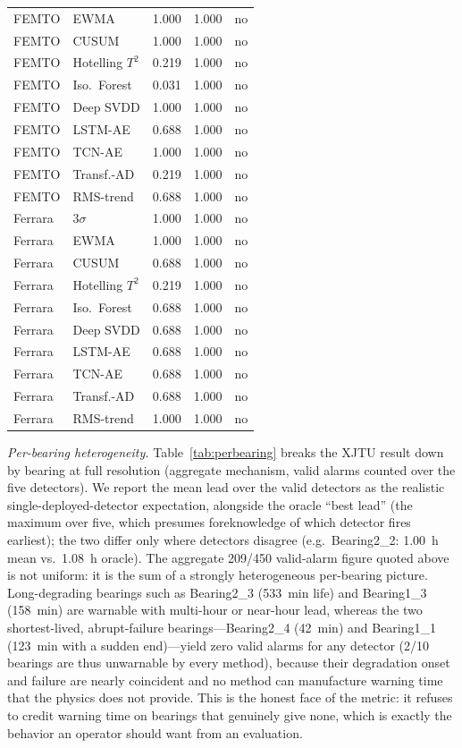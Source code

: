 \documentclass[IJPHM, 2026, 0]{PHMSociety}
\begin{document}
\begin{table}[t]
\begin{center}
\begin{tabular}{l l r r c}
		FEMTO & EWMA & 1.000 & 1.000 & no \\
		FEMTO & CUSUM & 1.000 & 1.000 & no \\
		FEMTO & Hotelling $T^2$ & 0.219 & 1.000 & no \\
		FEMTO & Iso.\ Forest & 0.031 & 1.000 & no \\
		FEMTO & Deep SVDD & 1.000 & 1.000 & no \\
		FEMTO & LSTM-AE & 0.688 & 1.000 & no \\
		FEMTO & TCN-AE & 1.000 & 1.000 & no \\
		FEMTO & Transf.-AD & 0.219 & 1.000 & no \\
		FEMTO & RMS-trend & 0.688 & 1.000 & no \\
		Ferrara & $3\sigma$ & 1.000 & 1.000 & no \\
		Ferrara & EWMA & 1.000 & 1.000 & no \\
		Ferrara & CUSUM & 0.688 & 1.000 & no \\
		Ferrara & Hotelling $T^2$ & 0.219 & 1.000 & no \\
		Ferrara & Iso.\ Forest & 0.688 & 1.000 & no \\
		Ferrara & Deep SVDD & 0.688 & 1.000 & no \\
		Ferrara & LSTM-AE & 0.688 & 1.000 & no \\
		Ferrara & TCN-AE & 0.688 & 1.000 & no \\
		Ferrara & Transf.-AD & 0.688 & 1.000 & no \\
		Ferrara & RMS-trend & 1.000 & 1.000 & no \\
		\hline \hline
	\end{tabular}
	\end{center}
\end{table}

\emph{Per-bearing heterogeneity.} Table~\ref{tab:perbearing} breaks the XJTU result down by bearing at full resolution (aggregate mechanism, valid alarms counted over the five detectors). We report the mean lead over the valid detectors as the realistic single-deployed-detector expectation, alongside the oracle ``best lead'' (the maximum over five, which presumes foreknowledge of which detector fires earliest); the two differ only where detectors disagree (e.g.\ Bearing2\_2: 1.00~h mean vs.\ 1.08~h oracle). The aggregate 209/450 valid-alarm figure quoted above is not uniform: it is the sum of a strongly heterogeneous per-bearing picture. Long-degrading bearings such as Bearing2\_3 (533~min life) and Bearing1\_3 (158~min) are warnable with multi-hour or near-hour lead, whereas the two shortest-lived, abrupt-failure bearings---Bearing2\_4 (42~min) and Bearing1\_1 (123~min with a sudden end)---yield zero valid alarms for any detector (2/10 bearings are thus unwarnable by every method), because their degradation onset and failure are nearly coincident and no method can manufacture warning time that the physics does not provide. This is the honest face of the metric: it refuses to credit warning time on bearings that genuinely give none, which is exactly the behavior an operator should want from an evaluation.
\end{document}
